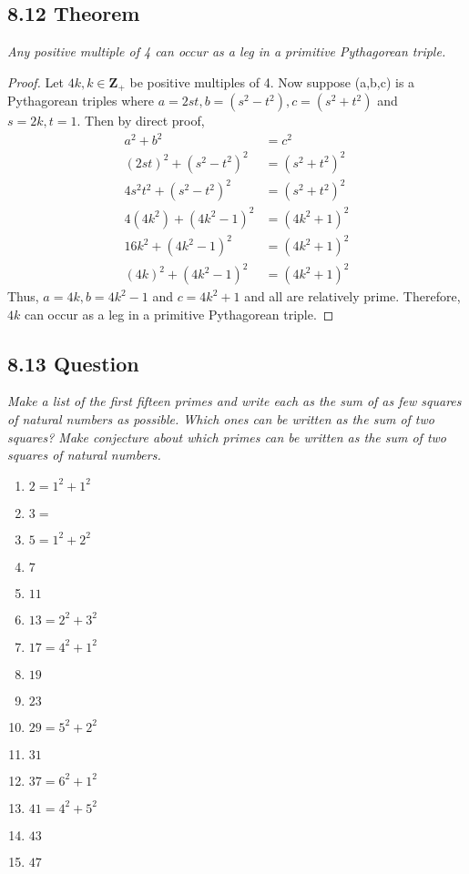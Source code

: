 \documentclass{article}
\begin{document}
\subsection*{8.12 Theorem} 
\quad \textit{Any positive multiple of 4 can occur as a leg in a primitive Pythagorean triple.}

\begin{proof}
Let $4k, k \in \mathbf{Z_+}$ be positive multiples of 4. Now suppose (a,b,c) is a Pythagorean triples where $a = 2st, b=(s^2-t^2), c= (s^2+t^2)$ and $s= 2k, t = 1$. Then by direct proof,
\begin{align*}
    &&a^2 + b^2 &= c^2 &&\\
    &&(2st)^2 + (s^2-t^2)^2 &= (s^2+t^2)^2 &&\\
    &&4s^2t^2 + (s^2-t^2)^2 &= (s^2+t^2)^2 &&\\
    &&4(4k^2) + (4k^2-1)^2 &= (4k^2+1)^2 &&\\
    &&16k^2 + (4k^2-1)^2 &= (4k^2+1)^2 &&\\
    &&(4k)^2 + (4k^2-1)^2 &= (4k^2+1)^2 &&
\end{align*}
Thus, $a= 4k, b= 4k^2-1$ and $c=4k^2+1$ and all are relatively prime. Therefore, $4k$ can occur as a leg in a primitive Pythagorean triple.
\end{proof}

\subsection*{8.13 Question} 
\quad \textit{Make a list of the first fifteen primes and write each as the sum of as few squares of natural numbers as possible. Which ones can be written as the sum of two squares? Make conjecture about which primes can be written as the sum of two squares of natural numbers.}

\begin{enumerate}
    \item $2 = 1^2 + 1^2$
    \item $3 = $
    \item $5 = 1^2 + 2^2$
    \item $7$
    \item $11$
    \item $13 = 2^2 + 3^2$
    \item $17 = 4^2 + 1^2$
    \item $19$
    \item $23$
    \item $29 = 5^2 + 2^2$
    \item $31$
    \item $37 = 6^2 + 1^2$
    \item $41 = 4^2 + 5^2$
    \item $43$
    \item $47$
\end{enumerate}
\end{document}
